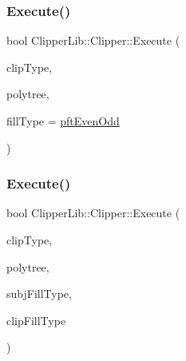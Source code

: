 \subsubsection{\texorpdfstring{Execute()}{Execute()}\hspace{0.1cm}{\footnotesize\ttfamily [3/4]}}
{\footnotesize\ttfamily bool Clipper\+Lib\+::\+Clipper\+::\+Execute (\begin{DoxyParamCaption}\item[{\mbox{\hyperlink{namespace_clipper_lib_a3db4fddd50b81ba657107505821d7f46}{Clip\+Type}}}]{clip\+Type,  }\item[{\mbox{\hyperlink{class_clipper_lib_1_1_poly_tree}{Poly\+Tree}} \&}]{polytree,  }\item[{\mbox{\hyperlink{namespace_clipper_lib_a95a41ff8fa6b351d304829c267d638d7}{Poly\+Fill\+Type}}}]{fill\+Type = {\ttfamily \mbox{\hyperlink{namespace_clipper_lib_a95a41ff8fa6b351d304829c267d638d7acede4475518a377720537448c7b2df73}{pft\+Even\+Odd}}} }\end{DoxyParamCaption})}

\mbox{\label{class_clipper_lib_1_1_clipper_a66e1adf49ba563b0ab21ab9cd035ee2c}} 
\subsubsection{\texorpdfstring{Execute()}{Execute()}\hspace{0.1cm}{\footnotesize\ttfamily [4/4]}}
{\footnotesize\ttfamily bool Clipper\+Lib\+::\+Clipper\+::\+Execute (\begin{DoxyParamCaption}\item[{\mbox{\hyperlink{namespace_clipper_lib_a3db4fddd50b81ba657107505821d7f46}{Clip\+Type}}}]{clip\+Type,  }\item[{\mbox{\hyperlink{class_clipper_lib_1_1_poly_tree}{Poly\+Tree}} \&}]{polytree,  }\item[{\mbox{\hyperlink{namespace_clipper_lib_a95a41ff8fa6b351d304829c267d638d7}{Poly\+Fill\+Type}}}]{subj\+Fill\+Type,  }\item[{\mbox{\hyperlink{namespace_clipper_lib_a95a41ff8fa6b351d304829c267d638d7}{Poly\+Fill\+Type}}}]{clip\+Fill\+Type }\end{DoxyParamCaption})}

\mbox{\label{class_clipper_lib_1_1_clipper_a3e8757e5f8a6ffcb7fd0f9630fde02d3}} 
